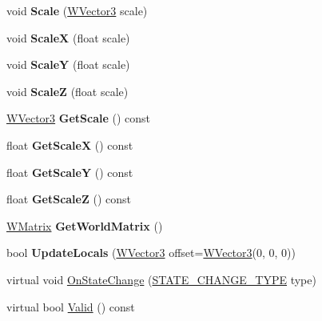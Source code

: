 \begin{DoxyCompactItemize}
\item 
void {\bfseries Scale} (\hyperlink{class_w_vector3}{W\+Vector3} scale)\hypertarget{class_w_object_ad4632595db1f1f661e0abb0d72e452b0}{}\label{class_w_object_ad4632595db1f1f661e0abb0d72e452b0}

\item 
void {\bfseries ScaleX} (float scale)\hypertarget{class_w_object_a53bf6f7cadd2ffe1b59cf1231305f31c}{}\label{class_w_object_a53bf6f7cadd2ffe1b59cf1231305f31c}

\item 
void {\bfseries ScaleY} (float scale)\hypertarget{class_w_object_a12dde8e7596a2ce595c509abe86606bd}{}\label{class_w_object_a12dde8e7596a2ce595c509abe86606bd}

\item 
void {\bfseries ScaleZ} (float scale)\hypertarget{class_w_object_a9b63d725ee1feb40dcc4facafdcb63fc}{}\label{class_w_object_a9b63d725ee1feb40dcc4facafdcb63fc}

\item 
\hyperlink{class_w_vector3}{W\+Vector3} {\bfseries Get\+Scale} () const \hypertarget{class_w_object_a1229c3548ecc1b1b64c48afaee85c5ad}{}\label{class_w_object_a1229c3548ecc1b1b64c48afaee85c5ad}

\item 
float {\bfseries Get\+ScaleX} () const \hypertarget{class_w_object_ade99923c893f2daf6d650e15a09f527b}{}\label{class_w_object_ade99923c893f2daf6d650e15a09f527b}

\item 
float {\bfseries Get\+ScaleY} () const \hypertarget{class_w_object_a9954b5dca076b1af9348e60c15310931}{}\label{class_w_object_a9954b5dca076b1af9348e60c15310931}

\item 
float {\bfseries Get\+ScaleZ} () const \hypertarget{class_w_object_a7e9c4970b7af1731370c7de335ff1c9d}{}\label{class_w_object_a7e9c4970b7af1731370c7de335ff1c9d}

\item 
\hyperlink{class_w_matrix}{W\+Matrix} {\bfseries Get\+World\+Matrix} ()\hypertarget{class_w_object_a95a5b7ec4028d109ee8aef1c53334d15}{}\label{class_w_object_a95a5b7ec4028d109ee8aef1c53334d15}

\item 
bool {\bfseries Update\+Locals} (\hyperlink{class_w_vector3}{W\+Vector3} offset=\hyperlink{class_w_vector3}{W\+Vector3}(0, 0, 0))\hypertarget{class_w_object_a5fa9d24d946c66ebd96d5291aaf1a273}{}\label{class_w_object_a5fa9d24d946c66ebd96d5291aaf1a273}

\item 
virtual void \hyperlink{class_w_object_a0e939f965dea9e524014c0dfc771d30f}{On\+State\+Change} (\hyperlink{_w_orientation_8h_afe94de0a48bbd7b343ab18bc318cef28}{S\+T\+A\+T\+E\+\_\+\+C\+H\+A\+N\+G\+E\+\_\+\+T\+Y\+PE} type)
\item 
virtual bool \hyperlink{class_w_object_a99b053864c7797f538f15728fc7f8a2c}{Valid} () const 
\end{DoxyCompactItemize}
